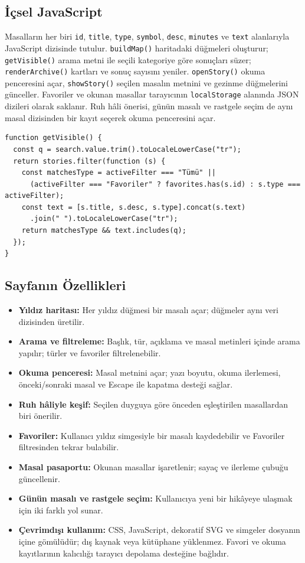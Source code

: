 \documentclass[12pt,a4paper]{article}
\begin{document}
\subsection{İçsel JavaScript}
Masalların her biri \texttt{id}, \texttt{title}, \texttt{type}, \texttt{symbol}, \texttt{desc}, \texttt{minutes} ve \texttt{text} alanlarıyla JavaScript dizisinde tutulur. \texttt{buildMap()} haritadaki düğmeleri oluşturur; \texttt{getVisible()} arama metni ile seçili kategoriye göre sonuçları süzer; \texttt{renderArchive()} kartları ve sonuç sayısını yeniler. \texttt{openStory()} okuma penceresini açar, \texttt{showStory()} seçilen masalın metnini ve gezinme düğmelerini günceller. Favoriler ve okunan masallar tarayıcının \texttt{localStorage} alanında JSON dizileri olarak saklanır. Ruh hâli önerisi, günün masalı ve rastgele seçim de aynı masal dizisinden bir kayıt seçerek okuma penceresini açar.

\begin{lstlisting}[caption={İçsel JavaScript'ten önemli bir bölüm}]
function getVisible() {
  const q = search.value.trim().toLocaleLowerCase("tr");
  return stories.filter(function (s) {
    const matchesType = activeFilter === "Tümü" ||
      (activeFilter === "Favoriler" ? favorites.has(s.id) : s.type === activeFilter);
    const text = [s.title, s.desc, s.type].concat(s.text)
      .join(" ").toLocaleLowerCase("tr");
    return matchesType && text.includes(q);
  });
}
\end{lstlisting}

\subsection{Sayfanın Özellikleri}
\begin{itemize}
  \item \textbf{Yıldız haritası:} Her yıldız düğmesi bir masalı açar; düğmeler aynı veri dizisinden üretilir.
  \item \textbf{Arama ve filtreleme:} Başlık, tür, açıklama ve masal metinleri içinde arama yapılır; türler ve favoriler filtrelenebilir.
  \item \textbf{Okuma penceresi:} Masal metnini açar; yazı boyutu, okuma ilerlemesi, önceki/sonraki masal ve Escape ile kapatma desteği sağlar.
  \item \textbf{Ruh hâliyle keşif:} Seçilen duyguya göre önceden eşleştirilen masallardan biri önerilir.
  \item \textbf{Favoriler:} Kullanıcı yıldız simgesiyle bir masalı kaydedebilir ve Favoriler filtresinden tekrar bulabilir.
  \item \textbf{Masal pasaportu:} Okunan masallar işaretlenir; sayaç ve ilerleme çubuğu güncellenir.
  \item \textbf{Günün masalı ve rastgele seçim:} Kullanıcıya yeni bir hikâyeye ulaşmak için iki farklı yol sunar.
  \item \textbf{Çevrimdışı kullanım:} CSS, JavaScript, dekoratif SVG ve simgeler dosyanın içine gömülüdür; dış kaynak veya kütüphane yüklenmez. Favori ve okuma kayıtlarının kalıcılığı tarayıcı depolama desteğine bağlıdır.
\end{itemize}
\end{document}
